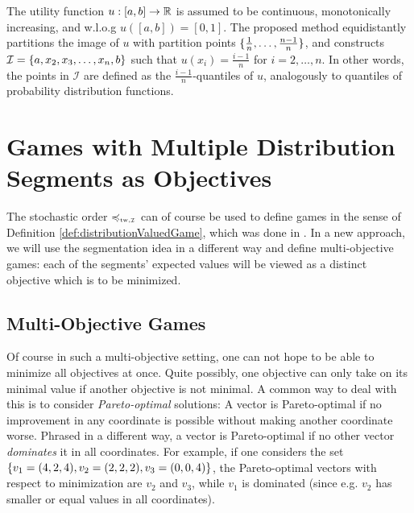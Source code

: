 \documentclass[a4paper]{scrreprt}
\begin{document}
    The utility function $u: [a, b] \to \mathbb{R}$ is assumed to be continuous, monotonically increasing, and w.l.o.g $u([a, b]) = [0, 1]$.
    The proposed method equidistantly partitions the image of $u$ with partition points $\{\frac{1}{n}, \dots, \frac{n-1}{n}\}$, and constructs $\mathcal{I} = \{a, x_2, x_3, \dots, x_n, b\}$ such that $u(x_i) = \frac{i-1}{n}$ for $i = 2, \dots, n$.
    In other words, the points in $\mathcal{I}$ are defined as the $\frac{i-1}{n}$-quantiles of $u$, analogously to quantiles of probability distribution functions.
    
    \section{Games with Multiple Distribution Segments as Objectives}
    The stochastic order $\leqtw$ can of course be used to define games in the sense of Definition \ref{def:distributionValuedGame}, which was done in \cite{bib:tweakableStochasticOrders}.
    In a new approach, we will use the segmentation idea in a different way and define multi-objective games: each of the segments' expected values will be viewed as a distinct objective which is to be minimized.
    
    \subsection{Multi-Objective Games}
    Of course in such a multi-objective setting, one can not hope to be able to minimize all objectives at once. Quite possibly, one objective can only take on its minimal value if another objective is not minimal. A common way to deal with this is to consider \emph{Pareto-optimal} solutions:
    A vector is Pareto-optimal if no improvement in any coordinate is possible without making another coordinate worse. Phrased in a different way, a vector is Pareto-optimal if no other vector \emph{dominates} it in all coordinates.
    For example, if one considers the set $\{v_1 = (4, 2, 4), v_2 = (2, 2, 2), v_3 = (0, 0, 4)\}$, the Pareto-optimal vectors with respect to minimization are $v_2$ and $v_3$, while $v_1$ is dominated (since e.g. $v_2$ has smaller or equal values in all coordinates).
    
\end{document}
